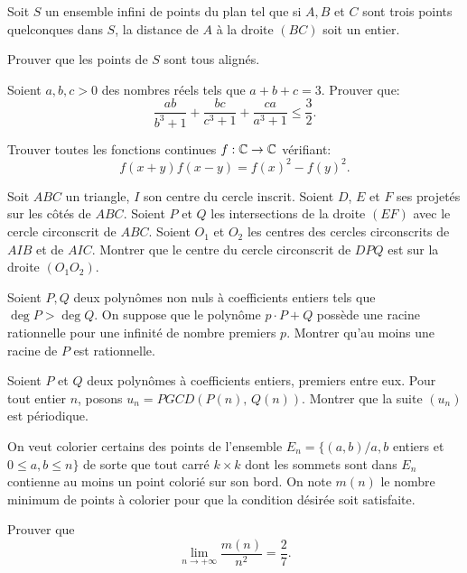 \begin{exo}{}
Soit $S$ un ensemble infini de points du plan tel que si $A,B$ et $C$ sont trois points quelconques  dans $S$, la distance de $A$ \`a la droite $(BC)$ soit un entier.

Prouver que les points de $S$ sont tous align\'es.
\end{exo}

\begin{exo}{}
Soient $a,b,c>0$ des nombres réels tels que $a+b+c=3$. Prouver que:
$$ \frac{ab}{b^{3}+1}+\frac{bc}{c^{3}+1}+\frac{ca}{a^{3}+1}\le\frac{3}{2}.$$
\end{exo}


\begin{exo}{}
Trouver toutes les fonctions continues $f: \mathbb C \rightarrow \mathbb C$ v\'erifiant:
$$f(x+y) f(x-y) = f(x)^2-f(y)^2.$$
\end{exo}

\begin{exo}{}Soit $ABC$ un triangle, $I$ son centre du cercle inscrit. Soient $D$, $E$ et $F$ ses projetés sur les côtés de $ABC$. Soient $P$ et $Q$ les intersections de la droite $(EF)$ avec le cercle circonscrit de $ABC$. Soient $O_1$ et $O_2$ les centres des cercles circonscrits de $AIB$ et de $AIC$. Montrer que le centre du cercle circonscrit de $DPQ$ est sur la droite $(O_1O_2)$.
\end{exo}

\begin{exo}{}
Soient $P,Q$ deux polynômes non nuls à coefficients entiers tels que $ \deg P>\deg Q$. On suppose que le polynôme $p \cdot P+Q$ possède une racine rationnelle pour une infinité de nombre premiers $p$. Montrer qu'au moins une racine de $P$ est rationnelle.
\end{exo}

\begin{exo}{}Soient $P$ et $Q$ deux polyn\^omes \`a coefficients entiers, premiers entre eux. Pour tout entier $n$, posons $u_n = PGCD(P(n), \, Q(n))$. Montrer que la suite $(u_n)$ est p\'eriodique.
\end{exo}




\begin{exo}{}
On veut colorier certains des points de l'ensemble $E_{n}=\{(a,b)/a,b$
entiers et $0\leq a,b\leq n\}$ de sorte que tout carr\'{e} $k\times k$ dont
les sommets sont dans $E_{n}$ contienne au moins un point colori\'{e} sur
son bord. On note $m(n)$ le nombre minimum de points \`{a} colorier pour que
la condition d\'{e}sir\'{e}e soit satisfaite.

Prouver que $${\lim_ {{n\rightarrow +\infty }} }\frac{m(n)}{n^{2}}=%
\frac{2}{7}.$$
\end{exo}

